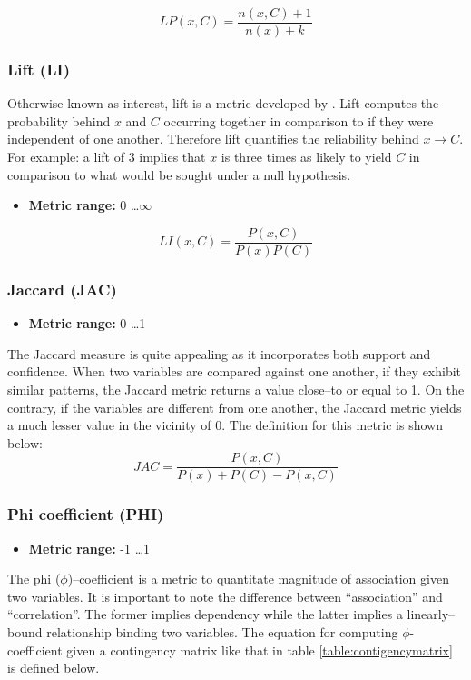 \documentclass{article}
\begin{document}
\begin{equation}
	LP(x, C) = \frac{n(x,C)+1} {n(x) + k}
\end{equation}

\subsubsection{Lift (LI)}
Otherwise known as interest, lift is a metric developed by
\cite{brin-sigmod-1997}. Lift computes the probability behind $x$ and $C$
occurring together in comparison to if they were independent of one another.
Therefore lift quantifies the reliability behind $x \rightarrow C$. For example: a lift of 3
implies that $x$ is three times as likely to yield $C$ in comparison to what
would be sought under a null hypothesis.
\begin{itemize}
  \item \textbf{Metric range:} 0 \ldots $\infty$
\end{itemize}
\begin{equation}
	LI(x, C) = \frac{P(x, C)}{P(x)P(C)}
\end{equation}

\subsubsection{Jaccard (JAC)}
\begin{itemize}
  \item \textbf{Metric range:} 0 \ldots 1
\end{itemize}
The Jaccard measure \cite{tan-sigkdd-2002} is quite appealing as it incorporates
both support and confidence. When two variables are compared against one
another, if they exhibit similar patterns, the Jaccard metric returns a value
close--to or equal to 1. On the contrary, if the variables are different from one
another, the Jaccard metric yields a much lesser value in the vicinity of 0. The
definition for this metric is shown below:
\begin{equation}
	JAC = \frac{P(x,C)}{P(x)+P(C)-P(x,C)}
\end{equation}

\subsubsection{Phi coefficient (PHI)}
\begin{itemize}
  \item \textbf{Metric range:} -1 \ldots 1
\end{itemize}
The phi ($\phi$)--coefficient is a metric to quantitate magnitude of association
given two variables. It is important to note the
difference between ``association'' and ``correlation''. The former implies dependency while the
latter implies a linearly--bound relationship binding two variables. The equation
for computing $\phi$-coefficient given a contingency matrix like that in table
\ref{table:contigencymatrix} is defined below. 
\end{document}
